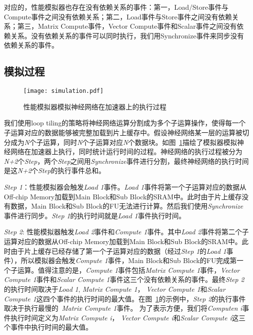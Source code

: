 对应的，性能模拟器也存在没有依赖关系的事件：第一，Load/Store事件与Compute事件之间没有依赖关系；第二，Load事件与Store事件之间没有依赖关系；第三，Matrix Compute事件，Vector Compute事件和Scalar事件之间没有依赖关系。没有依赖关系的事件可以同时执行，我们用Synchronize事件来同步没有依赖关系的事件。

\subsection{模拟过程}

\begin{figure}[h]
\centering
\texttt{[image: simulation.pdf]}
\caption{性能模拟器模拟神经网络在加速器上的执行过程}
\label{fig:simulation}
\end{figure}

我们使用loop tiling的策略将神经网络运算分割成为多个子运算操作，使得每一个子运算对应的数据能够被完整加载到片上缓存中。假设神经网络某一层的运算被切分成为\emph{N}个子运算，同时\emph{N}个子运算对应\emph{N}个数据块。如图~\ref{fig:simulation}描绘了模拟器模拟神经网络在加速器上执行，同时统计运行时间的过程。神经网络的执行过程被分为\emph{N+2}个\emph{Step}，两个\emph{Step}之间用\emph{Synchronize}事件进行分割，最终神经网络的执行时间是这\emph{N+2}个\emph{Step}的执行事件总和。

\emph{Step 1}：性能模拟器会触发\emph{Load 1}事件。\emph{Load 1}事件将第一个子运算对应的数据从Off-chip Memory加载到Main Block和Sub Block的SRAM中。此时由于片上缓存没有数据，Main Block和Sub Block的FU无法进行计算。然后我们使用\emph{Synchronize}事件进行同步。\emph{Step 1}的执行时间就是\emph{Load 1}事件执行时间。

\emph{Step 2}: 性能模拟器触发\emph{Load 2}事件和\emph{Compute 1}事件。其中\emph{Load 2}事件将第二个子运算对应的数据从Off-chip Memory加载到Main Block和Sub Block的SRAM中。此时由于片上缓存已经存储了第一个子运算对应的数据（经过\emph{Step 1}的\emph{Load 1}事件），所以模拟器会触发\emph{Compute 1}事件，Main Block和Sub Block的FU完成第一个子运算。值得注意的是，\emph{Compute 1}事件包括\emph{Matrix Compute 1}事件，\emph{Vector Compute 1}事件和\emph{Scalar Compute 1}事件这三个没有依赖关系的事件。最终\emph{Step 2}的执行时间取决于\emph{Load 1}, \emph{Matrix Compute 1}， \emph{Vector Compute 1}和\emph{Scalar Compute 1}这四个事件的执行时间的最大值。在图~\ref{fig:simulation}的示例中，\emph{Step 2}的执行事件取决于执行最慢的~\emph{Matrix Compute 1}事件。
为了表示方便，我们将\emph{Computen i}事件执行时间定义为\emph{Matrix Compute i}， \emph{Vector Compute i}和\emph{Scalar Compute i}这三个事件中执行时间的最大值。

